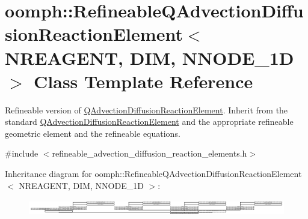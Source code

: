 \hypertarget{classoomph_1_1RefineableQAdvectionDiffusionReactionElement}{}\section{oomph\+:\+:Refineable\+Q\+Advection\+Diffusion\+Reaction\+Element$<$ N\+R\+E\+A\+G\+E\+NT, D\+IM, N\+N\+O\+D\+E\+\_\+1D $>$ Class Template Reference}
\label{classoomph_1_1RefineableQAdvectionDiffusionReactionElement}


Refineable version of \hyperlink{classoomph_1_1QAdvectionDiffusionReactionElement}{Q\+Advection\+Diffusion\+Reaction\+Element}. Inherit from the standard \hyperlink{classoomph_1_1QAdvectionDiffusionReactionElement}{Q\+Advection\+Diffusion\+Reaction\+Element} and the appropriate refineable geometric element and the refineable equations.  




{\ttfamily \#include $<$refineable\+\_\+advection\+\_\+diffusion\+\_\+reaction\+\_\+elements.\+h$>$}

Inheritance diagram for oomph\+:\+:Refineable\+Q\+Advection\+Diffusion\+Reaction\+Element$<$ N\+R\+E\+A\+G\+E\+NT, D\+IM, N\+N\+O\+D\+E\+\_\+1D $>$\+:\begin{figure}[H]
\begin{center}
\leavevmode
\includegraphics[height=0.700438cm]{classoomph_1_1RefineableQAdvectionDiffusionReactionElement}
\end{center}
\end{figure}
